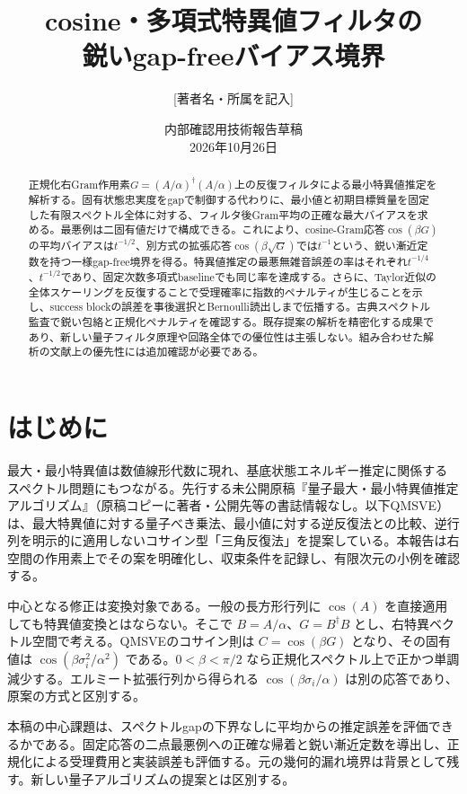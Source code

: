 \documentclass[11pt,a4paper]{article}
\title{cosine・多項式特異値フィルタの\\
鋭いgap-freeバイアス境界}
\author{[著者名・所属を記入]}
\date{内部確認用技術報告草稿\\2026年10月26日}
\begin{document}
\maketitle
{\jfont
\begin{abstract}
正規化右Gram作用素$G=(A/\alpha)^\dagger(A/\alpha)$上の反復フィルタによる最小特異値推定を解析する。固有状態忠実度をgapで制御する代わりに、最小値と初期目標質量を固定した有限スペクトル全体に対する、フィルタ後Gram平均の正確な最大バイアスを求める。最悪例は二固有値だけで構成できる。これにより、cosine-Gram応答$\cos(\beta G)$の平均バイアスは$t^{-1/2}$、別方式の拡張応答$\cos(\beta\sqrt G)$では$t^{-1}$という、鋭い漸近定数を持つ一様gap-free境界を得る。特異値推定の最悪無雑音誤差の率はそれぞれ$t^{-1/4}$、$t^{-1/2}$であり、固定次数多項式baselineでも同じ率を達成する。さらに、Taylor近似の全体スケーリングを反復することで受理確率に指数的ペナルティが生じることを示し、success blockの誤差を事後選択とBernoulli読出しまで伝播する。古典スペクトル監査で鋭い包絡と正規化ペナルティを確認する。既存提案の解析を精密化する成果であり、新しい量子フィルタ原理や回路全体での優位性は主張しない。組み合わせた解析の文献上の優先性には追加確認が必要である。
\end{abstract}

\section{はじめに}
最大・最小特異値は数値線形代数に現れ、基底状態エネルギー推定に関係するスペクトル問題にもつながる。先行する未公開原稿『量子最大・最小特異値推定アルゴリズム』（原稿コピーに著者・公開先等の書誌情報なし。以下QMSVE）は、最大特異値に対する量子べき乗法、最小値に対する逆反復法との比較、逆行列を明示的に適用しないコサイン型「三角反復法」を提案している\cite{QMSVE}。本報告は右空間の作用素上でその案を明確化し、収束条件を記録し、有限次元の小例を確認する。

中心となる修正は変換対象である。一般の長方形行列に $\cos(A)$ を直接適用しても特異値変換とはならない。そこで $B=A/\alpha$、$G=B^\dagger B$ とし、右特異ベクトル空間で考える。QMSVEのコサイン則は $C=\cos(\beta G)$ となり、その固有値は $\cos(\beta\sigma_i^2/\alpha^2)$ である。$0<\beta<\pi/2$ なら正規化スペクトル上で正かつ単調減少する。エルミート拡張行列から得られる $\cos(\beta\sigma_i/\alpha)$ は別の応答であり、原案の方式と区別する。

本稿の中心課題は、スペクトルgapの下界なしに平均からの推定誤差を評価できるかである。固定応答の二点最悪例への正確な帰着と鋭い漸近定数を導出し、正規化による受理費用と実装誤差も評価する。元の幾何的漏れ境界は背景として残す。新しい量子アルゴリズムの提案とは区別する。

}
\end{document}

